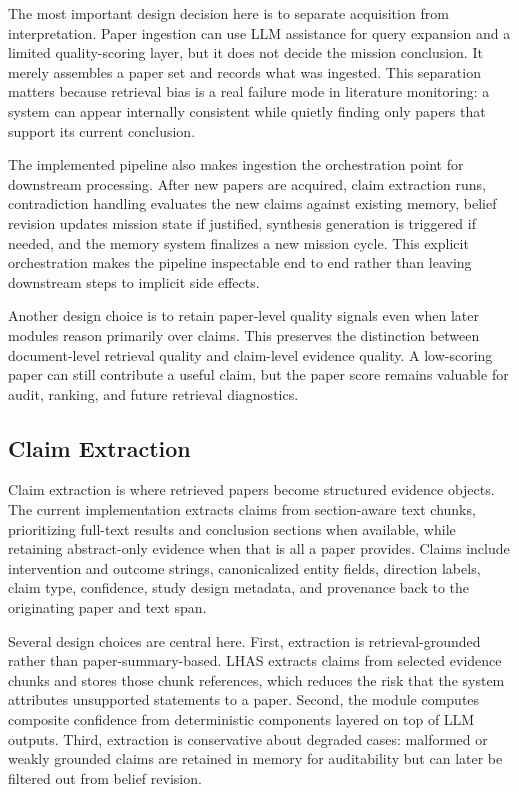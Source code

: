 \documentclass[manuscript,screen,review]{jair}
\begin{document}
The most important design decision here is to separate acquisition from interpretation. Paper ingestion can use LLM assistance for query expansion and a limited quality-scoring layer, but it does not decide the mission conclusion. It merely assembles a paper set and records what was ingested. This separation matters because retrieval bias is a real failure mode in literature monitoring: a system can appear internally consistent while quietly finding only papers that support its current conclusion.

The implemented pipeline also makes ingestion the orchestration point for downstream processing. After new papers are acquired, claim extraction runs, contradiction handling evaluates the new claims against existing memory, belief revision updates mission state if justified, synthesis generation is triggered if needed, and the memory system finalizes a new mission cycle. This explicit orchestration makes the pipeline inspectable end to end rather than leaving downstream steps to implicit side effects.

Another design choice is to retain paper-level quality signals even when later modules reason primarily over claims. This preserves the distinction between document-level retrieval quality and claim-level evidence quality. A low-scoring paper can still contribute a useful claim, but the paper score remains valuable for audit, ranking, and future retrieval diagnostics.

\subsection{Claim Extraction}
Claim extraction is where retrieved papers become structured evidence objects. The current implementation extracts claims from section-aware text chunks, prioritizing full-text results and conclusion sections when available, while retaining abstract-only evidence when that is all a paper provides. Claims include intervention and outcome strings, canonicalized entity fields, direction labels, claim type, confidence, study design metadata, and provenance back to the originating paper and text span.

Several design choices are central here. First, extraction is retrieval-grounded rather than paper-summary-based. LHAS extracts claims from selected evidence chunks and stores those chunk references, which reduces the risk that the system attributes unsupported statements to a paper. Second, the module computes composite confidence from deterministic components layered on top of LLM outputs. Third, extraction is conservative about degraded cases: malformed or weakly grounded claims are retained in memory for auditability but can later be filtered out from belief revision.
\end{document}
